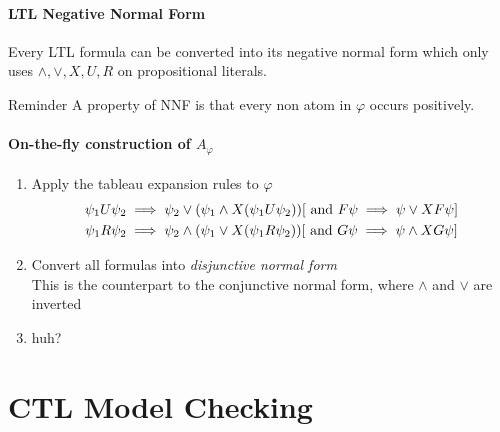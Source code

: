 \documentclass{article}
\begin{document}
\paragraph{LTL Negative Normal Form}
Every LTL formula can be converted into its negative normal form which only uses $\wedge,\vee,X,U,R$ on propositional literals.

\begin{callout}{Reminder}
    A property of NNF is that every non atom in $\varphi$ occurs positively.
\end{callout}

\paragraph{On-the-fly construction of $A_\varphi$}
\begin{enumerate}
    \item Apply the tableau expansion rules to $\varphi$
        \begin{gather*}
            \psi_1 U \psi_2 \implies \psi_2 \vee (\psi_1\wedge X(\psi_1 U \psi_2)) [\text{ and } F\psi\implies\psi \vee XF\psi] \\
            \psi_1 R \psi_2 \implies \psi_2 \wedge (\psi_1\vee X(\psi_1 R \psi_2)) [\text{ and } G\psi\implies\psi \wedge XG\psi] 
        \end{gather*}
    \item Convert all formulas into \textit{disjunctive normal form}\\
        This is the counterpart to the conjunctive normal form, where $\wedge$ and $\vee$ are inverted
    \item huh?
\end{enumerate}

\section{CTL Model Checking}
\end{document}
